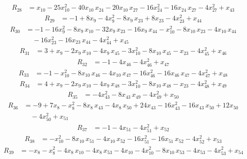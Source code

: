 \begin{align*}
R_{28} &= x_{10} -25x_{10}^{2} -40x_{10}\,x_{24} -20x_{10}\,x_{27} -16x_{24}^{2} -16x_{24}\,x_{27} -4x_{27}^{2} +x_{43}
\end{align*}
\begin{align*}
R_{29} &= -1 +8x_{9} -4x_{9}^{2} -8x_{9}\,x_{23} +8x_{23} -4x_{23}^{2} +x_{44}
\end{align*}
\begin{align*}
R_{30} &= -1 -16x_{9}^{2} -8x_{9}\,x_{10} -32x_{9}\,x_{23} -16x_{9}\,x_{44} -x_{10}^{2} -8x_{10}\,x_{23} -4x_{10}\,x_{44} \\
&\quad {} -16x_{23}^{2} -16x_{23}\,x_{44} -4x_{44}^{2} +x_{45}
\end{align*}
\begin{align*}
R_{31} &= 3 +x_{9} -2x_{9}\,x_{10} -4x_{9}\,x_{45} -3x_{10}^{2} -8x_{10}\,x_{45} -x_{23} -4x_{45}^{2} +x_{46}
\end{align*}
\begin{align*}
R_{32} &= -1 -4x_{46} -4x_{46}^{2} +x_{47}
\end{align*}
\begin{align*}
R_{33} &= -1 -x_{10}^{2} -8x_{10}\,x_{46} -4x_{10}\,x_{47} -16x_{46}^{2} -16x_{46}\,x_{47} -4x_{47}^{2} +x_{48}
\end{align*}
\begin{align*}
R_{34} &= 4 +x_{9} -2x_{9}\,x_{10} -4x_{9}\,x_{48} -3x_{10}^{2} -8x_{10}\,x_{48} -x_{23} -4x_{48}^{2} +x_{49}
\end{align*}
\begin{align*}
R_{35} &= -4x_{43}^{2} -8x_{43}\,x_{49} -4x_{49}^{2} +x_{50}
\end{align*}
\begin{align*}
R_{36} &= -9 +7x_{8} -x_{8}^{2} -8x_{8}\,x_{43} -4x_{8}\,x_{50} +24x_{43} -16x_{43}^{2} -16x_{43}\,x_{50} +12x_{50} \\
&\quad {} -4x_{50}^{2} +x_{51}
\end{align*}
\begin{align*}
R_{37} &= -1 -4x_{51} -4x_{51}^{2} +x_{52}
\end{align*}
\begin{align*}
R_{38} &= -x_{10}^{2} -8x_{10}\,x_{51} -4x_{10}\,x_{52} -16x_{51}^{2} -16x_{51}\,x_{52} -4x_{52}^{2} +x_{53}
\end{align*}
\begin{align*}
R_{39} &= -x_{8} -x_{8}^{2} -4x_{8}\,x_{10} -4x_{8}\,x_{53} -4x_{10} -4x_{10}^{2} -8x_{10}\,x_{53} -4x_{53} -4x_{53}^{2} +x_{54}
\end{align*}
